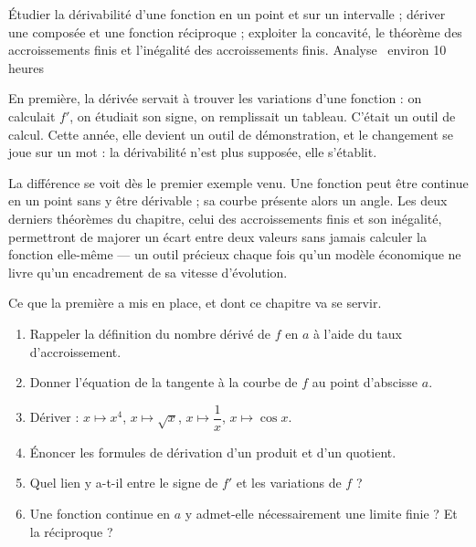   {Étudier la dérivabilité d'une fonction en un point et sur un intervalle ;
   dériver une composée et une fonction réciproque ; exploiter la concavité, le
   théorème des accroissements finis et l'inégalité des accroissements finis.}
  {Analyse \textbullet\ environ 10 heures}

En première, la dérivée servait à trouver les variations d'une fonction : on
calculait $f'$, on étudiait son signe, on remplissait un tableau. C'était un
outil de calcul. Cette année, elle devient un outil de démonstration, et le
changement se joue sur un mot : la dérivabilité n'est plus supposée, elle
s'établit.

La différence se voit dès le premier exemple venu. Une fonction peut être
continue en un point sans y être dérivable ; sa courbe présente alors un
angle. Les deux derniers théorèmes du chapitre, celui des accroissements finis
et son inégalité, permettront de majorer un écart entre deux valeurs sans
jamais calculer la fonction elle-même — un outil précieux chaque fois qu'un
modèle économique ne livre qu'un encadrement de sa vitesse d'évolution.

\begin{revision}
Ce que la première a mis en place, et dont ce chapitre va se servir.

\begin{enumerate}[label=\textbf{\arabic*.}, leftmargin=*, itemsep=0.35em]
  \item Rappeler la définition du nombre dérivé de $f$ en $a$ à l'aide du taux
        d'accroissement.
  \item Donner l'équation de la tangente à la courbe de $f$ au point
        d'abscisse $a$.
  \item Dériver : $x \mapsto x^{4}$, $x \mapsto \sqrt{x}$,
        $x \mapsto \dfrac{1}{x}$, $x \mapsto \cos x$.
  \item Énoncer les formules de dérivation d'un produit et d'un quotient.
  \item Quel lien y a-t-il entre le signe de $f'$ et les variations de $f$ ?
  \item Une fonction continue en $a$ y admet-elle nécessairement une limite
        finie ? Et la réciproque ?
\end{enumerate}
\end{revision}

